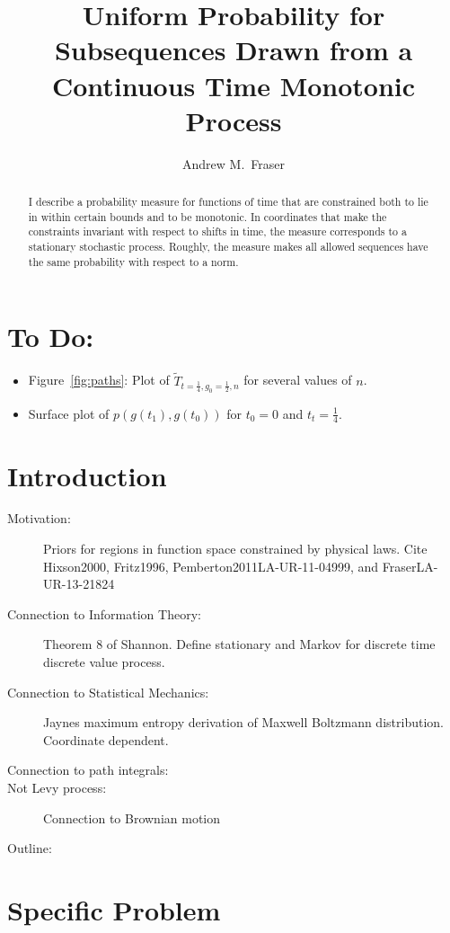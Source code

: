 \documentclass[12pt]{article} \usepackage{amsmath,amsfonts}
\title{Uniform Probability for Subsequences Drawn from a Continuous
  Time Monotonic Process }
\author{Andrew M.\ Fraser}
\begin{document}
\maketitle
\begin{abstract}
  I describe a probability measure for functions of time that are
  constrained both to lie in within certain bounds and to be
  monotonic.  In coordinates that make the constraints invariant with
  respect to shifts in time, the measure corresponds to a stationary
  stochastic process.  Roughly, the measure makes all allowed
  sequences have the same probability with respect to a norm.
\end{abstract}

\section*{To Do:}
\label{sec:do}

\begin{itemize}
\item Figure~\ref{fig:paths}: Plot of
  $\tilde T_{t=\frac{1}{4},g_0=\frac{1}{2},n}$ for several values of
  $n$.
\item Surface plot of $p(g(t_1),g(t_0))$ for $t_0=0$ and
  $t_t=\frac{1}{4}$.
\end{itemize}

\section{Introduction}
\label{sec:introduction}
\begin{description}
\item[Motivation:] Priors for regions in function space constrained by
  physical laws.  Cite Hixson2000, Fritz1996,
  Pemberton2011LA-UR-11-04999, and FraserLA-UR-13-21824
\item[Connection to Information Theory:] Theorem 8 of Shannon.  Define
  stationary and Markov for discrete time discrete value process.
\item[Connection to Statistical Mechanics:] Jaynes maximum entropy
  derivation of Maxwell Boltzmann distribution.  Coordinate dependent.
\item[Connection to path integrals:]
\item[Not Levy process:] Connection to Brownian motion
\item[Outline:]
\end{description}

\section{Specific Problem}
\label{sec:specific}
\end{document}
